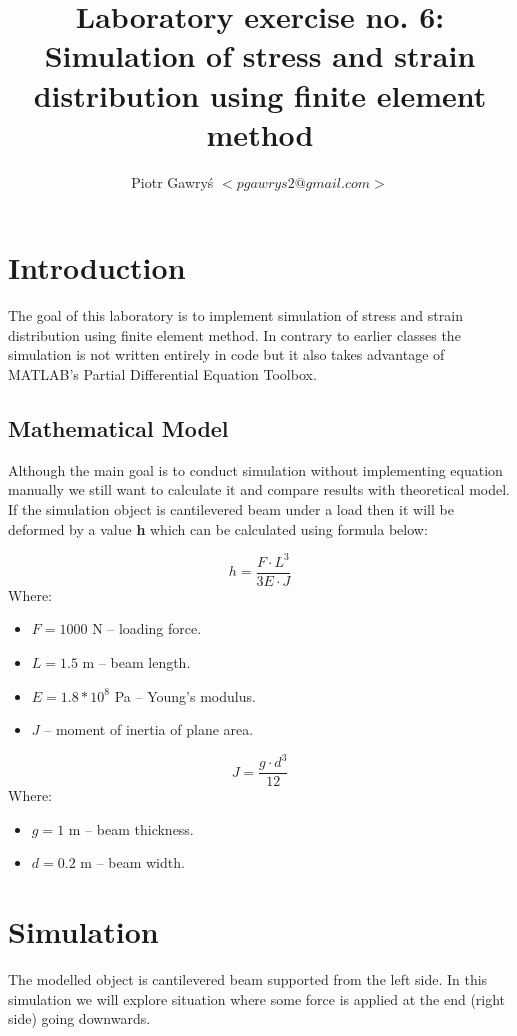 \documentclass[12pt]{article}
\title{Laboratory exercise no. 6: Simulation of stress and strain distribution using finite element method
}
\author{Piotr Gawry\'s $<pgawrys2@gmail.com>$}
\begin{document}
\maketitle

\section{Introduction}
The goal of this laboratory is to implement simulation of stress and strain distribution using finite element method. In contrary to earlier classes the simulation is not written entirely in code but it also takes advantage of MATLAB's Partial Differential Equation Toolbox.

\subsection{Mathematical Model}
\label{model}
Although the main goal is to conduct simulation without implementing equation manually we still want to calculate it and compare results with theoretical model. If the simulation object is cantilevered beam under a load then it will be deformed by a value \textbf{h} which can be calculated using formula below:

\begin{equation}
h = \frac{F \cdot L^3}{3E \cdot J}
\end{equation}
Where:
\begin{itemize}
	\item $F = 1000$ N -- loading force.
	\item $L = 1.5$ m -- beam length.
	\item $E = 1.8 * 10^{8}$ Pa -- Young's modulus.
	\item $J$ -- moment of inertia of plane area.
\end{itemize}

\begin{equation}
 J = \frac{g \cdot d^3}{12}
\end{equation}
Where:
\begin{itemize}
	\item $g = 1$ m -- beam thickness.
	\item $d = 0.2$ m -- beam width.
\end{itemize}


\section{Simulation}

The modelled object is cantilevered beam supported from the left side. In this simulation we will explore situation where some force is applied at the end (right side) going downwards.
\end{document}
